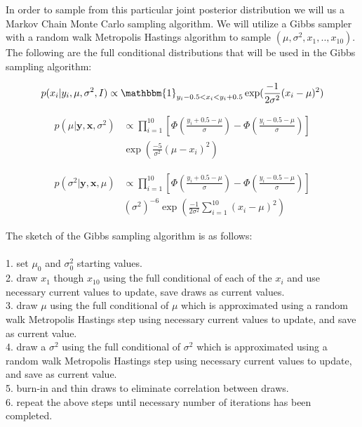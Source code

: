 \documentclass{asaproc}
\begin{document}
In order to sample from this particular joint posterior distribution we will us a Markov Chain Monte Carlo sampling algorithm.  We will utilize a Gibbs sampler with a random walk Metropolis Hastings algorithm to sample $(\mu, \sigma^2, x_{1},..,x_{10})$.  The following are the full conditional distributions that will be used in the Gibbs sampling algorithm:

\begin{equation*}
p(x_{i}|y_{i},\mu,\sigma^2,I) \propto \mathbbm{1}_{y_{i}-0.5<x_{i}<y_{i}+0.5}\exp(\frac{-1}{2\sigma^2}(x_{i}-\mu)^2)
\end{equation*}

\begin{align*}
p(\mu|\mathbf{y},\mathbf{x},\sigma^2) &\propto \prod_{i=1}^{10}[\Phi(\frac{y_{i}+0.5-\mu}{\sigma}) - \Phi(\frac{y_{i}-0.5-\mu}{\sigma})]\\&\exp(\frac{-5}{\sigma^2}(\mu-x_{i})^2)
\end{align*}

\begin{align*}
p(\sigma^2|\mathbf{y},\mathbf{x},\mu) &\propto \prod_{i=1}^{10}[\Phi(\frac{y_{i}+0.5-\mu}{\sigma}) - \Phi(\frac{y_{i}-0.5-\mu}{\sigma})]\\&(\sigma^2)^{-6}\exp(\frac{-1}{2\sigma^2}\sum_{i=1}^{10}(x_{i}-\mu)^2)
\end{align*}

The sketch of the Gibbs sampling algorithm is as follows:\\\\
1. set $\mu_0$ and $\sigma^2_0$ starting values. \\
2. draw $x_1$ though $x_10$ using the full conditional of each of the $x_{i}$ and use necessary current values to update, save draws as current values. \\
3. draw $\mu$ using the full conditional of $\mu$ which is approximated using a random walk Metropolis Hastings step using necessary current values to update, and save as current value. \\
4. draw a $\sigma^2$ using the full conditional of $\sigma^2$ which is approximated using a random walk Metropolis Hastings step using necessary current values to update, and save as current value. \\
5. burn-in and thin draws to eliminate correlation between draws. \\
6. repeat the above steps until necessary number of iterations has been completed. \\
\end{document}
